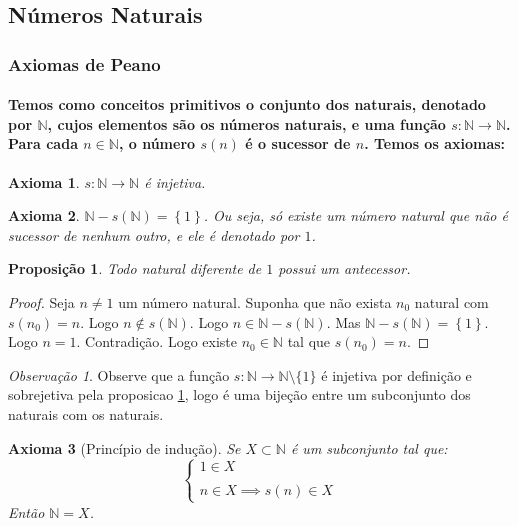 \documentclass{article}
\theoremstyle{plain}
\newtheorem{axioma}{Axioma}
\newtheorem{prop}{Proposição}[section]
\theoremstyle{definition}
\theoremstyle{remark}
\newtheorem{obs}{Observação}[section]
\begin{document}
\subsection{Números Naturais}
\subsubsection{Axiomas de Peano}
\paragraph{Temos como conceitos primitivos o conjunto dos naturais, denotado por $\mathbb{N}$, cujos elementos são os números naturais, e uma função $s:\mathbb{N} \to \mathbb{N}$. Para cada $n\in \mathbb{N}$, o número $s(n)$ é o sucessor de $n$.  Temos os axiomas:}
\begin{axioma}
	$s:\mathbb{N} \to \mathbb{N}$ é injetiva.
\end{axioma}
\begin{axioma}
	$\mathbb{N} - s(\mathbb{N}) = \left\{ 1 \right\}$. Ou seja, só existe um número natural que não é sucessor de nenhum outro, e ele é denotado por $1$.
\end{axioma}
\begin{prop}
	\label{propsuc}
	Todo natural diferente de $1$ possui um antecessor.
\end{prop}
\begin{proof}
	Seja $n\neq 1$ um número natural. Suponha que não exista $n_0$ natural com $s(n_0) = n$. Logo $n \not \in s\left(\mathbb{N}\right)$. Logo $n\in \mathbb{N} - s(\mathbb{N})$. Mas $\mathbb{N} - s(\mathbb{N}) = \left\{ 1 \right\}$. Logo $n = 1$. Contradição. Logo existe  $n_0\in \mathbb{N}$ tal que $s(n_0) = n$.
\end{proof}
\begin{obs}
	Observe que a função $s: \mathbb{N} \to \mathbb{N}\setminus \{1\}$ é injetiva por definição e sobrejetiva pela proposicao \ref{propsuc}, logo é uma bijeção entre um subconjunto dos naturais com os naturais.
\end{obs}
\begin{axioma}[Princípio de indução]
	Se $X\subset \mathbb{N}$ é  um subconjunto tal que: 
	$$
	\begin{cases}
		1 \in X\\~\\
		n \in X \implies s(n) \in X
	\end{cases}
	$$
	Então $\mathbb{N} = X$.
\end{axioma}
\end{document}
